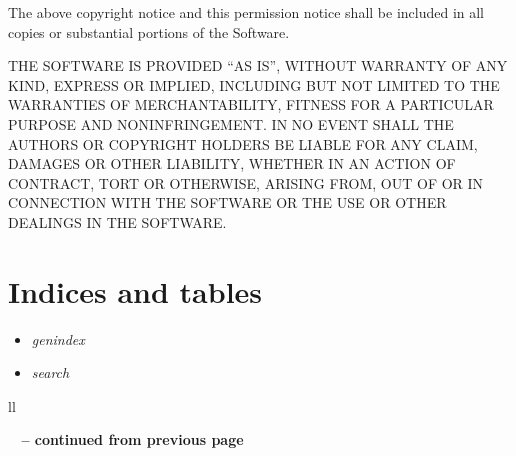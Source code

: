 \documentclass[letterpaper,10pt,english]{sphinxmanual}
\begin{document}
The above copyright notice and this permission notice shall be included in all copies or
substantial portions of the Software.

THE SOFTWARE IS PROVIDED ``AS IS'', WITHOUT WARRANTY OF ANY KIND, EXPRESS OR IMPLIED, INCLUDING BUT
NOT LIMITED TO THE WARRANTIES OF MERCHANTABILITY, FITNESS FOR A PARTICULAR PURPOSE AND
NONINFRINGEMENT. IN NO EVENT SHALL THE AUTHORS OR COPYRIGHT HOLDERS BE LIABLE FOR ANY CLAIM,
DAMAGES OR OTHER LIABILITY, WHETHER IN AN ACTION OF CONTRACT, TORT OR OTHERWISE, ARISING FROM, OUT
OF OR IN CONNECTION WITH THE SOFTWARE OR THE USE OR OTHER DEALINGS IN THE SOFTWARE.


\section{Indices and tables}
\label{index:indices-and-tables}\begin{itemize}
\item {} 
\emph{genindex}

\item {} 
\emph{search}

\end{itemize}

\begin{longtable}{ll}
\hline
\endfirsthead

%
{{\bfseries \tablename\ \thetable{} -- continued from previous page}} \\
\hline
\endhead

\hline {} \\ \hline
\endfoot

\hline
\endlastfoot

\end{longtable}




\renewcommand{\indexname}{Index}
\printindex
\end{document}
